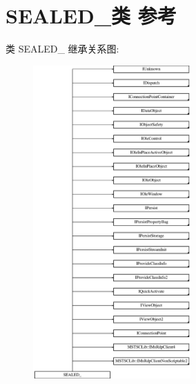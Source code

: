 \hypertarget{class_s_e_a_l_e_d__}{}\section{S\+E\+A\+L\+E\+D\+\_\+类 参考}
\label{class_s_e_a_l_e_d__}
类 S\+E\+A\+L\+E\+D\+\_\+ 继承关系图\+:\begin{figure}[H]
\begin{center}
\leavevmode
\includegraphics[height=12.000000cm]{class_s_e_a_l_e_d__}
\end{center}
\end{figure}
